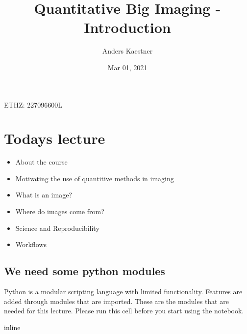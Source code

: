 \documentclass[letterpaper,10pt,english]{sphinxmanual}
\title{Quantitative Big Imaging - Introduction}
\date{Mar 01, 2021}
\author{Anders Kaestner}
\begin{document}
\pagestyle{empty}
\sphinxmaketitle
\pagestyle{plain}
\sphinxtableofcontents
\pagestyle{normal}
\label{\detokenize{01-Introduction::doc}}


\sphinxAtStartPar
{} ETHZ: 227\sphinxhyphen{}0966\sphinxhyphen{}00L




\chapter{Todays lecture}
\label{\detokenize{01-Introduction:todays-lecture}}\begin{itemize}
\item {} 
\sphinxAtStartPar
About the course

\item {} 
\sphinxAtStartPar
Motivating the use of quantitive methods in imaging

\item {} 
\sphinxAtStartPar
What is an image?

\item {} 
\sphinxAtStartPar
Where do images come from?

\item {} 
\sphinxAtStartPar
Science and Reproducibility

\item {} 
\sphinxAtStartPar
Workflows

\end{itemize}


\section{We need some python modules}
\label{\detokenize{01-Introduction:we-need-some-python-modules}}
\sphinxAtStartPar
Python is a modular scripting language with limited functionality. Features are added through modules that are imported.
These are the modules that are needed for this lecture. Please run this cell before you start using the notebook.

\begin{sphinxVerbatim}[commandchars=\\\{\}]
   
   
   
 inline

   
   
   
   
   
 
   
\end{sphinxVerbatim}
\end{document}
